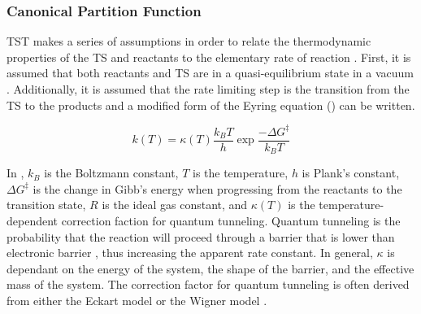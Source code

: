 \documentclass[preprint, 11pt]{elsarticle} %
\begin{document}
\subsubsection{Canonical Partition Function}

TST makes a series of assumptions in order to relate the thermodynamic properties of the TS and reactants to the elementary rate of reaction \cite{eyring:1935}. 
First, it is assumed that both reactants and TS are in a quasi-equilibrium state in a vacuum \cite{QSS:2017}.
Additionally, it is assumed that the rate limiting step is the transition from the TS to the products and a modified form of the Eyring equation () can be written.

\begin{equation}
    k(T) = \kappa(T) \frac{k_B T}{h} \exp{\frac{-\Delta G^\ddagger}{k_B T}}
    \label{eyring:1}
\end{equation}

In , $k_B$ is the Boltzmann constant, $T$ is the temperature, $h$ is Plank's constant, $\Delta G^\ddagger$ is the change in Gibb's energy when progressing from the reactants to the transition state, $R$ is the ideal gas constant, 
and $\kappa(T)$ is the temperature-dependent correction faction for quantum tunneling.
Quantum tunneling is the probability that the reaction will proceed through a barrier that is lower than electronic barrier \cite{RUBAKOV:1984}, thus increasing the apparent rate constant.
In general, $\kappa$ is dependant on the energy of the system, the shape of the barrier, and the effective mass of the system.
The correction factor for quantum tunneling is often derived from either the Eckart model \cite{eckart:1930} or the Wigner model \cite{Winger:1932}.
\end{document}
